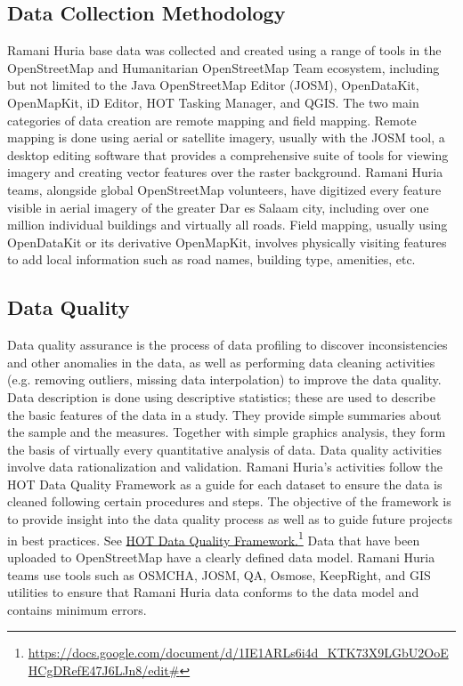 \documentclass[a4paper,12pt,twoside]{article}
\begin{document}
\subsection{Data Collection Methodology}
Ramani Huria base data was collected and created using a range of tools in the OpenStreetMap and Humanitarian OpenStreetMap Team ecosystem, including but not limited to the Java OpenStreetMap Editor (JOSM), OpenDataKit, OpenMapKit, iD Editor, HOT Tasking Manager, and QGIS. 
The two main categories of data creation are remote mapping and field mapping. Remote mapping is done using aerial or satellite imagery, usually with the JOSM tool, a desktop editing software that provides a comprehensive suite of tools for viewing imagery and creating vector features over the raster background. Ramani Huria teams, alongside global OpenStreetMap volunteers, have digitized every feature visible in aerial imagery of the greater Dar es Salaam city, including over one million individual buildings and virtually all roads.
Field mapping, usually using OpenDataKit or its derivative OpenMapKit, involves physically visiting features to add local information such as road names, building type, amenities, etc.

\subsection{Data Quality}

Data quality assurance is the process of data profiling to discover inconsistencies and other anomalies in the data, as well as performing data cleaning activities (e.g. removing outliers, missing data interpolation) to improve the data quality. Data description is done using descriptive statistics; these are used to describe the basic features of the data in a study. They provide simple summaries about the sample and the measures. Together with simple graphics analysis, they form the basis of virtually every quantitative analysis of data.
Data quality activities involve data rationalization and validation. Ramani Huria's activities follow the HOT Data Quality Framework as a guide for each dataset to ensure the data is cleaned following certain procedures and steps. The objective of the framework is to provide insight into the data quality process as well as to guide future projects in best practices. See \href{https://docs.google.com/document/d/1IE1ARLs6i4d_KTK73X9LGbU2OoEHCgDRefE47J6LJn8/edit#}{HOT Data Quality Framework.}\footnote{\url{https://docs.google.com/document/d/1IE1ARLs6i4d_KTK73X9LGbU2OoEHCgDRefE47J6LJn8/edit#}}
Data that have been uploaded to OpenStreetMap have a clearly defined data model. Ramani Huria teams use tools such as OSMCHA, JOSM, QA, Osmose, KeepRight, and GIS utilities to ensure that Ramani Huria data conforms to the data model and contains minimum errors.
\end{document}

